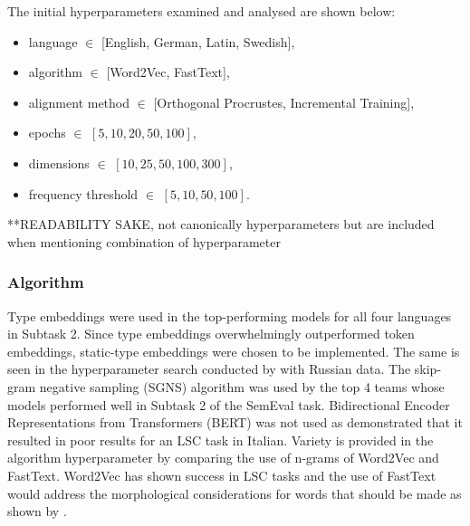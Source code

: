 The initial hyperparameters examined and analysed are shown below:
\begin{itemize}
    \item language $\in$ [English, German, Latin, Swedish],
    \item algorithm $\in$ [Word2Vec, FastText],
    \item alignment method $\in$ [Orthogonal Procrustes, Incremental Training],
    \item epochs $\in$ $[5, 10, 20, 50, 100]$,
    \item dimensions $\in$ $[10, 25, 50, 100, 300]$,
    \item frequency threshold $\in$ $[5, 10, 50, 100]$.
\end{itemize}%


**READABILITY SAKE, not canonically hyperparameters but are included when mentioning combination of hyperparameter

\subsubsection{Algorithm}
Type embeddings were used in the top-performing models for all four languages in Subtask 2.  Since type embeddings overwhelmingly outperformed token embeddings, static-type embeddings were chosen to be implemented. The same is seen in the hyperparameter search conducted by \citet{hengchen2021SBXrushifteval} with Russian data. The skip-gram negative sampling (SGNS) algorithm was used by the top 4 teams whose models performed well in Subtask 2 of the SemEval task. Bidirectional Encoder Representations from Transformers (BERT) was not used as \citet{laicher-2020} demonstrated that it resulted in poor results for an LSC task in Italian. Variety is provided in the algorithm hyperparameter by comparing the use of n-grams of Word2Vec and FastText. Word2Vec has shown success in LSC tasks and the use of FastText would address the morphological considerations for words that should be made as shown by \citet{bojanowski2017enriching}.

